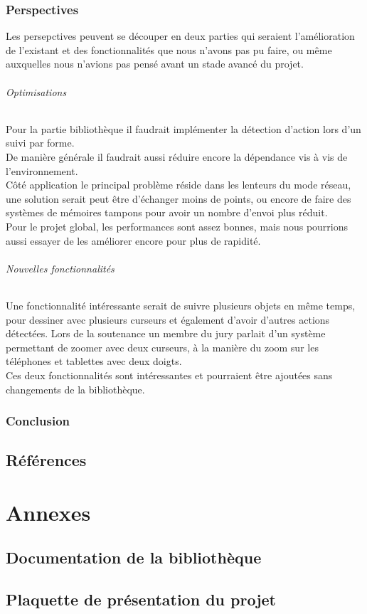 \documentclass{report}
\begin{document}
		\section{Perspectives}
		Les persepctives peuvent se découper en deux parties qui seraient l'amélioration de l'existant et des fonctionnalités que nous n'avons pas pu faire, ou même auxquelles nous n'avions pas pensé avant un stade avancé du projet. \\
		
		\paragraph{Optimisations}
		Pour la partie bibliothèque il faudrait implémenter la détection d'action lors d'un suivi par forme. \\
		De manière générale il faudrait aussi réduire encore la dépendance vis à vis de l'environnement. \\
		Côté application le principal problème réside dans les lenteurs du mode réseau, une solution serait peut être d'échanger moins de points, ou encore de faire des systèmes de mémoires tampons pour avoir un nombre d'envoi plus réduit. \\
		
		Pour le projet global, les performances sont assez bonnes, mais nous pourrions aussi essayer de les améliorer encore pour plus de rapidité. \\ 
		
		\paragraph{Nouvelles fonctionnalités}
		Une fonctionnalité intéressante serait de suivre plusieurs objets en même temps, pour dessiner avec plusieurs curseurs et également d'avoir d'autres actions détectées. Lors de la soutenance un membre du jury parlait d'un système permettant de zoomer avec deux curseurs, à la manière du zoom sur les téléphones et tablettes avec deux doigts. \\
Ces deux fonctionnalités sont intéressantes et pourraient être ajoutées sans changements de la bibliothèque. \\		
		\section{Conclusion}
	
	\chapter{Références}
	
	\part{Annexes}
	\appendix
		\chapter{Documentation de la bibliothèque}
		
		\chapter{Plaquette de présentation du projet}
		
\end{document}
